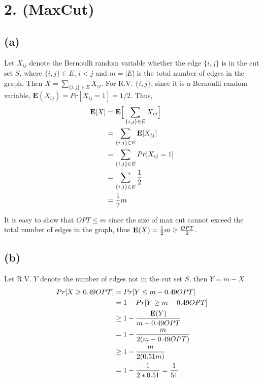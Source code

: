 \documentclass[11pt]{537homework}
\author{Peilun Dai}
\begin{document}
\section*{2. (MaxCut) }



\subsection*{(a)}

Let $X_{ij}$ denote the Bernoulli random variable whether the edge $\{i,j\}$ is in the cut set $S$, where $\{i,j\} \in E$, $i<j$ and $m=|E|$ is the total number of edges in the graph. Then $X = \sum_{\{i, j\} \in E} X_{ij}$. For R.V. $\{i,j\}$, since it is a Bernoulli random variable, $\mathbf{E}(X_{ij}) = Pr[X_{ij}=1] = 1/2$. Thus,
\begin{align}
  \mathbf{E}[X]   & = \mathbf{E}\Big[\sum_{\{i, j\} \in E} X_{ij}\Big] \\
                  & = \sum_{\{i, j\} \in E} \mathbf{E}[X_{ij}] \\
                  & = \sum_{\{i, j\} \in E} Pr[X_{ij} = 1] \\
                  & = \sum_{\{i, j\} \in E} {1 \over 2} \\
                  & = {1 \over 2}m
\end{align}

It is easy to show that $OPT \leq m$ since the size of max cut cannot exceed the total number of edges in the graph, thus $\mathbf{E}(X) = {1 \over 2}m \geq {OPT \over 2}$.


\subsection*{(b)}

\proof Let R.V. $Y$ denote the number of edges not in the cut set $S$, then $Y = m - X$. 
\begin{align}
  Pr[X \geq 0.49 OPT]   & = Pr[Y \leq m - 0.49 OPT] \\
                        & = 1 - Pr[Y \geq m - 0.49 OPT] \\
                        & \geq 1 - {\mathbf{E}(Y) \over m - 0.49 OPT} \\
                        & = 1 - {m \over 2(m - 0.49 OPT)} \\
                        & \geq 1 - {m \over 2(0.51m) } \\
                        & = 1 - {1 \over 2 * 0.51}  = {1 \over 51}
\end{align}
\end{document}
